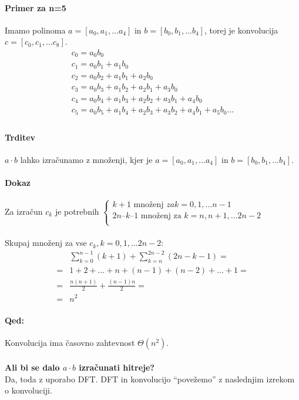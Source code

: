 \documentclass[a4paper,10pt]{article}
\begin{document}
\paragraph{Primer za n=5}
Imamo polinoma $a=[a_0, a_1,... a_4]$ in $b = [b_0, b_1,... b_4]$, torej je konvolucija $c=[c_0, c_1,... c_8]$.
$$
\begin{array}{l}
c_0 = a_0b_0 \\
c_1 = a_0b_1 + a_1b_0 \\
c_2 = a_0b_2 + a_1b_1 + a_2b_0 \\
c_3 = a_0b_3 + a_1b_2 + a_2b_1 + a_3b_0 \\
c_4 = a_0b_4 + a_1b_3 + a_2b_2 + a_3b_1 +a_4b_0 \\
c_5 = a_0b_5 + a_1b_4 + a_2b_3 + a_3b_2 +a_4b_1 + a_5b_0 \ldots \\
\end{array}
$$

\paragraph{Trditev}
$a \cdot b$ lahko izra\v cunamo z  mno\v zenji, kjer je $a=[a_0, a_1,... a_4]$ in $b = [b_0, b_1,... b_4]$.

\paragraph{Dokaz}
Za izra\v cun $c_k$ je potrebnih $
\left \{
\begin{array}{l}
k + 1 \mbox{ mno\v zenj } za k = 0, 1,... n-1 \\
2n – k – 1 \mbox{ mno\v zenj za } k = n, n+1,... 2n-2 \\
\end{array}
\right.
$\\
\\
Skupaj mno\v zenj za vse $c_k, k=0, 1,... 2n-2$:
$$
\begin{array}{ll}
  & \sum_{k=0}^{n-1} (k+1) + \sum_{k=n}^{2n-2} (2n - k - 1) = \\
= & 1 + 2 + \ldots + n + (n-1) + (n-2) + \ldots + 1 = \\
= & \frac{n(n+1)}{2} + \frac{(n-1)n}{2} = \\
= & n^2
\end{array}
$$

\paragraph{Qed:}
Konvolucija ima \v casovno zahtevnost $\Theta (n^2)$.\\
\\
\textbf{Ali bi se dalo $a\cdot b$ izra\v cunati hitreje?}\\
Da, toda z uporabo DFT. DFT in konvolucijo “pove\v zemo” z naslednjim izrekom o konvoluciji.
\end{document}
